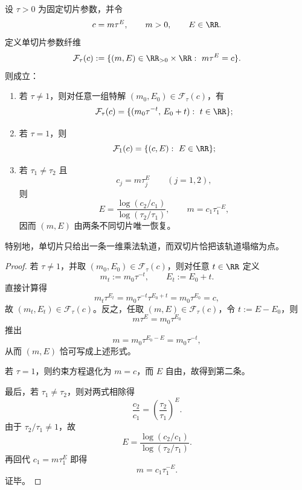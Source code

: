 \begin{theorem}[单切片参数纤维的乘法轨道结构与双切片刚性]\label{thm:conclusion-residue-slice-single-orbit-double-slice-rigidity}
设 \(\tau>0\) 为固定切片参数，并令
\[
c=m\tau^E,
\qquad
m>0,
\qquad
E\in\RR.
\]
定义单切片参数纤维
\[
\mathcal F_{\tau}(c):=\{(m,E)\in\RR_{>0}\times\RR:\ m\tau^E=c\}.
\]
则成立：
\begin{enumerate}
  \item 若 \(\tau\neq 1\)，则对任意一组特解 \((m_0,E_0)\in \mathcal F_{\tau}(c)\)，有
        \[
        \mathcal F_{\tau}(c)
        =
        \{(m_0\tau^{-t},\,E_0+t):\ t\in\RR\};
        \]
  \item 若 \(\tau=1\)，则
        \[
        \mathcal F_{1}(c)=\{(c,E):\ E\in\RR\};
        \]
  \item 若 \(\tau_1\neq \tau_2\) 且
        \[
        c_j=m\tau_j^E
        \qquad (j=1,2),
        \]
        则
        \[
        E=\frac{\log(c_2/c_1)}{\log(\tau_2/\tau_1)},
        \qquad
        m=c_1\tau_1^{-E},
        \]
        因而 \((m,E)\) 由两条不同切片唯一恢复。
\end{enumerate}
特别地，单切片只给出一条一维乘法轨道，而双切片恰把该轨道塌缩为点。
\end{theorem}
\begin{proof}
若 \(\tau\neq 1\)，并取 \((m_0,E_0)\in\mathcal F_{\tau}(c)\)，则对任意 \(t\in\RR\) 定义
\[
m_t:=m_0\tau^{-t},
\qquad
E_t:=E_0+t.
\]
直接计算得
\[
m_t\tau^{E_t}=m_0\tau^{-t}\tau^{E_0+t}=m_0\tau^{E_0}=c,
\]
故 \((m_t,E_t)\in \mathcal F_{\tau}(c)\)。反之，任取 \((m,E)\in \mathcal F_{\tau}(c)\)，令 \(t:=E-E_0\)，则
\[
m\tau^{E}=m_0\tau^{E_0}
\]
推出
\[
m=m_0\tau^{E_0-E}=m_0\tau^{-t},
\]
从而 \((m,E)\) 恰可写成上述形式。

若 \(\tau=1\)，则约束方程退化为 \(m=c\)，而 \(E\) 自由，故得到第二条。

最后，若 \(\tau_1\neq \tau_2\)，则对两式相除得
\[
\frac{c_2}{c_1}=\left(\frac{\tau_2}{\tau_1}\right)^E.
\]
由于 \(\tau_2/\tau_1\neq 1\)，故
\[
E=\frac{\log(c_2/c_1)}{\log(\tau_2/\tau_1)}.
\]
再回代 \(c_1=m\tau_1^E\) 即得
\[
m=c_1\tau_1^{-E}.
\]
证毕。
\end{proof}

